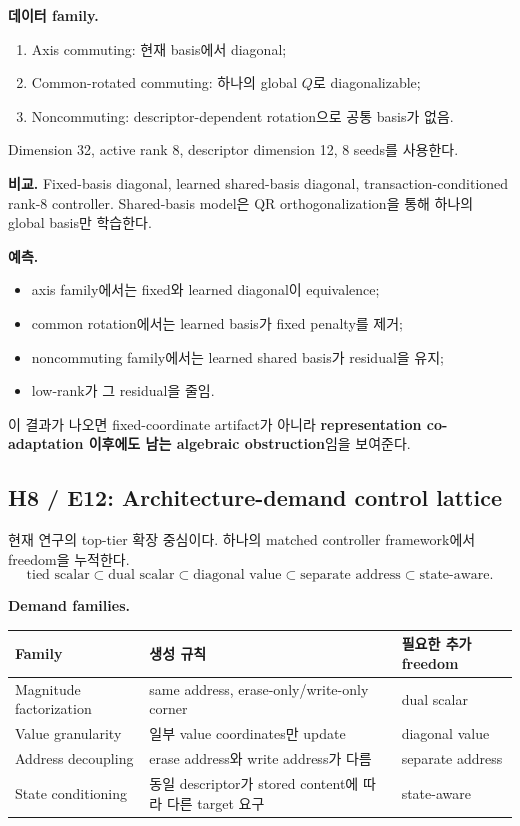 \documentclass[10.3pt,a4paper]{article}
\begin{document}
\textbf{데이터 family.}
\begin{enumerate}
\item Axis commuting: 현재 basis에서 diagonal;
\item Common-rotated commuting: 하나의 global $Q$로 diagonalizable;
\item Noncommuting: descriptor-dependent rotation으로 공통 basis가 없음.
\end{enumerate}
Dimension 32, active rank 8, descriptor dimension 12, 8 seeds를 사용한다.

\textbf{비교.} Fixed-basis diagonal, learned shared-basis diagonal, transaction-conditioned rank-8 controller. Shared-basis model은 QR orthogonalization을 통해 하나의 global basis만 학습한다.

\textbf{예측.}
\begin{itemize}
\item axis family에서는 fixed와 learned diagonal이 equivalence;
\item common rotation에서는 learned basis가 fixed penalty를 제거;
\item noncommuting family에서는 learned shared basis가 residual을 유지;
\item low-rank가 그 residual을 줄임.
\end{itemize}

이 결과가 나오면 fixed-coordinate artifact가 아니라 \textbf{representation co-adaptation 이후에도 남는 algebraic obstruction}임을 보여준다.

\subsection{H8 / E12: Architecture-demand control lattice}
현재 연구의 top-tier 확장 중심이다. 하나의 matched controller framework에서 freedom을 누적한다.
\[
\text{tied scalar}
\subset
\text{dual scalar}
\subset
\text{diagonal value}
\subset
\text{separate address}
\subset
\text{state-aware}.
\]

\textbf{Demand families.}
\begin{center}
\begin{tabularx}{\textwidth}{lXl}
\toprule
Family & 생성 규칙 & 필요한 추가 freedom \\
\midrule
Magnitude factorization & same address, erase-only/write-only corner & dual scalar \\
Value granularity & 일부 value coordinates만 update & diagonal value \\
Address decoupling & erase address와 write address가 다름 & separate address \\
State conditioning & 동일 descriptor가 stored content에 따라 다른 target 요구 & state-aware \\
\bottomrule
\end{tabularx}
\end{center}
\end{document}
